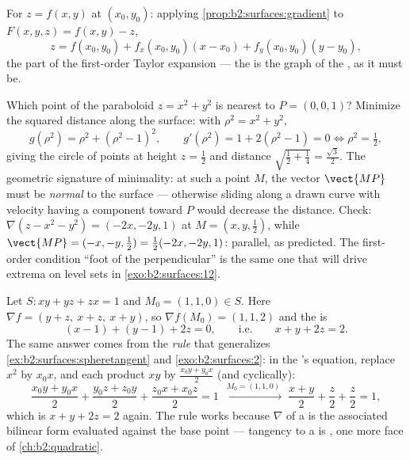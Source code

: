 \begin{example}\label{ex:b2:surfaces:graphtangent}
For $z = f(x, y)$ at $(x_0, y_0)$: applying
\cref{prop:b2:surfaces:gradient} to $F(x,y,z) = f(x,y) - z$,
\[
z = f(x_0, y_0)
+ f_x(x_0, y_0)(x - x_0)
+ f_y(x_0, y_0)(y - y_0) ,
\]
the  part of the first-order Taylor expansion --- the
 is the graph of the , as it must be.
\end{example}

\begin{example}\label{ex:b2:surfaces:closest}
Which point of the paraboloid $z = x^2 + y^2$ is nearest to
$P = (0, 0, 1)$? Minimize the squared distance along the
surface: with $\rho^2 = x^2 + y^2$,
\[
g(\rho^2) = \rho^2 + (\rho^2 - 1)^2,
\qquad
g'(\rho^2) = 1 + 2(\rho^2 - 1) = 0
\iff \rho^2 = \tfrac12 ,
\]
giving the circle of points at height $z = \frac12$ and
distance $\sqrt{\tfrac12 + \tfrac14} = \frac{\sqrt3}2$. The
geometric signature of minimality: at such a point $M$, the
vector $\vect{MP}$ must be \emph{normal} to the surface ---
otherwise sliding along a drawn curve with velocity having a
component toward $P$ would decrease the distance. Check:
$\nabla(z - x^2 - y^2) = (-2x, -2y, 1)$ at $M = (x, y,
\tfrac12)$, while $\vect{MP} = (-x, -y, \tfrac12) =
\tfrac12(-2x, -2y, 1)$: parallel, as predicted. The
first-order condition ``foot of the perpendicular'' is the
same one that will drive extrema on level sets in
\cref{exo:b2:surfaces:12}.
\end{example}

\begin{example}\label{ex:b2:surfaces:polarization}
Let $S : xy + yz + zx = 1$ and $M_0 = (1, 1, 0) \in S$. Here
$\nabla f = (y + z,\ x + z,\ x + y)$, so $\nabla f(M_0) = (1,
1, 2)$ and the  is
\[
(x - 1) + (y - 1) + 2z = 0,
\qquad\text{i.e.}\qquad x + y + 2z = 2 .
\]
The same answer comes from the \emph{ rule} that
generalizes \cref{ex:b2:surfaces:spheretangent} and
\cref{exo:b2:surfaces:2}: in the 's equation, replace
$x^2$ by $x_0x$, and each product $xy$ by $\frac{x_0y +
y_0x}2$ (and cyclically):
\[
\frac{x_0y + y_0x}2 + \frac{y_0z + z_0y}2 + \frac{z_0x +
x_0z}2 = 1
\;\xrightarrow{\ M_0 = (1,1,0)\ }\;
\frac{x + y}2 + \frac z2 + \frac z2 = 1 ,
\]
which is $x + y + 2z = 2$ again. The rule works because
$\nabla$ of a  is the associated bilinear form
evaluated against the base point --- tangency to a  is
, one more face of \cref{ch:b2:quadratic}.
\end{example}

